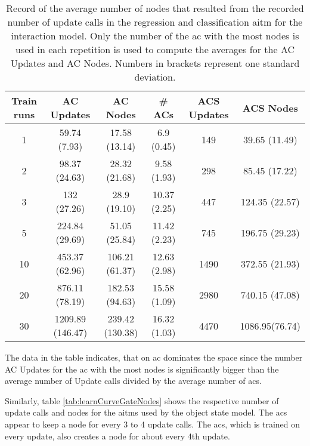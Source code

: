 \begin{table}
\footnotesize 
	\centering
	\begin{tabular*}{\textwidth}{@{\extracolsep{\fill}} c c c c c c}
			\hline \textbf{Train runs} & \textbf{AC Updates}&  \textbf{AC Nodes} & \textbf{\# ACs} & \textbf{ACS Updates} &\textbf{ACS Nodes} \\ 
			\hline \hline 
			 1 & 59.74 (7.93) & 17.58 (13.14) & 6.9 (0.45) & 149 & 39.65 (11.49) \\
			 2 & 98.37 (24.63) & 28.32 (21.68) & 9.58 (1.93) & 298 & 85.45 (17.22) \\  
			 3 & 132 (27.26) & 28.9 (19.10) & 10.37 (2.25) & 447 & 124.35 (22.57) \\
			 5 & 224.84 (29.69) & 51.05 (25.84) & 11.42 (2.23) & 745 & 196.75 (29.23) \\
			 10 & 453.37 (62.96) & 106.21 (61.37) & 12.63 (2.98) & 1490 & 372.55 (21.93) \\
			 20 & 876.11 (78.19) & 182.53 (94.63) & 15.58 (1.09) & 2980 & 740.15 (47.08) \\
			 30 & 1209.89 (146.47) & 239.42 (130.38) & 16.32 (1.03) & 4470 & 1086.95(76.74) \\
			\hline 
	\end{tabular*} 
	\caption{Record of the average number of nodes that resulted from the recorded number of update calls in the regression and classification \gls{aitm} for the interaction model. Only the number of the \gls{ac} with the most nodes is used in each repetition is used to compute the averages for the AC Updates and AC Nodes. Numbers in brackets represent one standard deviation.}
	\label{tab:learnCurveInteractionNodes}
\end{table}

The data in the table indicates, that on \gls{ac} dominates the space since the number AC Updates for the \gls{ac} with the most nodes is significantly bigger than the average number of Update calls divided by the average number of \glspl{ac}.

Similarly, table \ref{tab:learnCurveGateNodes} shows the respective number of update calls and nodes for the \glspl{aitm} used by the object state model.
The \glspl{ac} appear to keep a node for every 3 to 4 update calls. The \gls{acs}, which is trained on every update, also creates a node for about every 4th update.

